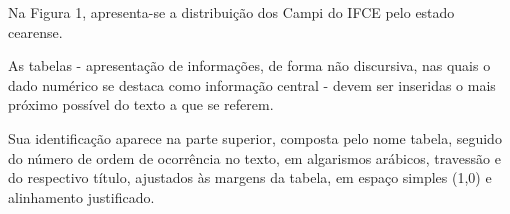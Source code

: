 Na Figura 1, apresenta-se a distribuição dos Campi do IFCE pelo estado cearense.

\begin{figure}[!ht]
\centering
\label{fig:exemplo-1}
\end{figure}

\newpage


As tabelas - apresentação de informações, de forma não discursiva, nas quais o dado numérico se destaca como informação central - devem ser inseridas o mais próximo possível do texto a que se referem.

Sua identificação aparece na parte superior, composta pelo nome tabela, seguido do número de ordem de ocorrência no texto, em algarismos arábicos, travessão e do respectivo título, ajustados às margens da tabela, em espaço simples (1,0) e alinhamento justificado.

